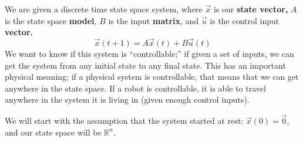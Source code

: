 

We are given a discrete time state space system, where $\vec{x}$ is our \textbf{state vector,} $A$ is the state space \textbf{model}, $B$ is the input \textbf{matrix}, and $\vec{u}$ is the control input \textbf{vector.}
\begin{equation}
\vec{x}(t + 1) = A \vec{x}(t) + B\vec{u}(t)
\end{equation}
We want to know if this system is “controllable;” if given a set of inputs, we can get the system from any initial state to any final state. This has an important physical meaning; if a physical system is controllable, that means that we can get anywhere in the state space. If a robot is controllable, it is able to travel anywhere in the system it is living in (given enough control inputs).

We will start with the assumption that the system started at rest: $\vec{x}(0) = \vec{0},$ and our state space will be $\mathbb{R}^{n}.$ 

